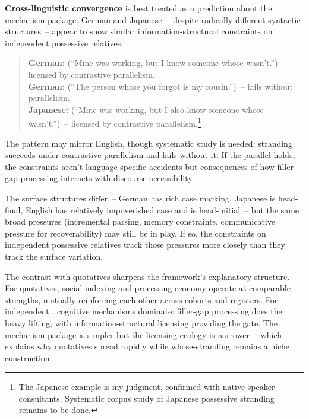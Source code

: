 \textbf{Cross-linguistic convergence} is best treated as a prediction about the mechanism package. German and Japanese~-- despite radically different syntactic structures~-- appear to show similar information-structural constraints on independent possessive relatives:

\begin{quote}
\textbf{German:}  (\enquote{Mine was working, but I know someone whose wasn't.})~-- licensed by contrastive parallelism.\\
\textbf{German:} \ungram{} (\enquote{The person whose you forgot is my cousin.})~-- fails without parallelism.\\
\textbf{Japanese:}  (\enquote{Mine was working, but I also know someone whose wasn't.})~-- licensed by contrastive parallelism.\footnote{The Japanese example is my judgment, confirmed with native-speaker consultants. Systematic corpus study of Japanese possessive stranding remains to be done.}
\end{quote}

The pattern may mirror English, though systematic study is needed: stranding succeeds under contrastive parallelism and fails without it. If the parallel holds, the constraints aren't language-specific accidents but consequences of how filler-gap processing interacts with discourse accessibility.

The surface structures differ~-- German has rich case marking, Japanese is head-final, English has relatively impoverished case and is head-initial~-- but the same broad pressures (incremental parsing, memory constraints, communicative pressure for recoverability) may still be in play. If so, the constraints on independent possessive relatives track those pressures more closely than they track the surface variation.

The contrast with quotatives sharpens the framework's explanatory structure. For quotatives, social indexing and processing economy operate at comparable strengths, mutually reinforcing each other across cohorts and registers. For independent , cognitive mechanisms dominate: filler-gap processing does the heavy lifting, with information-structural licensing providing the gate. The mechanism package is simpler but the licensing ecology is narrower~-- which explains why quotatives spread rapidly while whose-stranding remains a niche construction.


